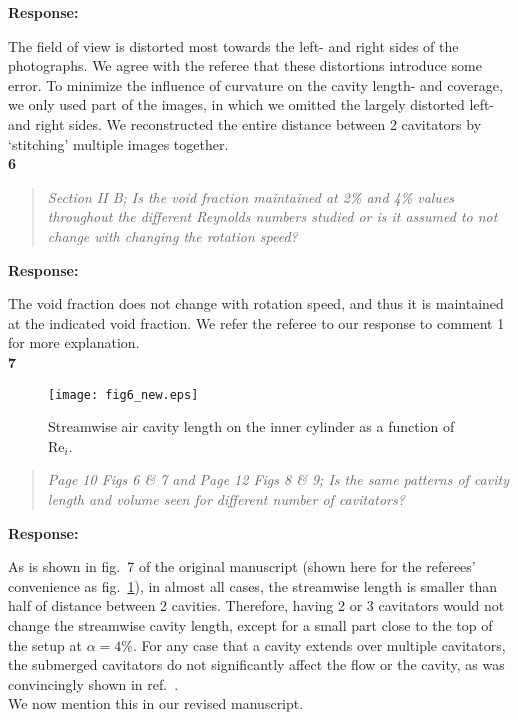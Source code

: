 \documentclass[10pt]{article}
\renewcommand{\Re}{\mathrm{Re}}
\newcommand{\strong}[1]{\textbf{#1}}
\newcommand{\question}[1]{\begin{quote} \emph{#1}  \end{quote} }
\begin{document}
\noindent \strong{Response:} 

\noindent  The field of view is distorted most towards the left- and right sides of the photographs. We agree with the referee that these distortions introduce some error. To minimize the influence of curvature on the cavity length- and coverage, we only used part of the images, in which we omitted the largely distorted left- and right sides. We reconstructed the entire distance between 2 cavitators by `stitching' multiple images together. \\ 

\noindent \strong{6}

\question{Section II B; Is the void fraction maintained at 2\% and 4\% values throughout the different Reynolds numbers studied or is it assumed to not change with changing the rotation speed? }

\noindent \strong{Response:} 

\noindent The void fraction does not change with rotation speed, and thus it is maintained at the indicated void fraction. We refer the referee to our response to comment 1 for more explanation. \\

\noindent \strong{7}


\begin{figure}[htp]
\begin{center}
\texttt{[image: fig6\_new.eps]}
\caption{Streamwise air cavity length on the inner cylinder as a function of $\Re_i$. }
\label{fig:length}
\end{center}
\end{figure} 

\question{Page 10 Figs 6 \& 7 and Page 12 Figs 8 \& 9; Is the same patterns of cavity length and volume seen for different number of cavitators? }

\noindent \strong{Response:} 

\noindent As is shown in fig.\ 7 of the original manuscript (shown here for the referees' convenience as fig.\ \ref{fig:length}), in almost all cases, the streamwise length is smaller than half of distance between 2 cavities. Therefore, having 2 or 3 cavitators would not change the streamwise cavity length, except for a small part close to the top of the setup at $\alpha=4\%$.  For any case that a cavity extends over multiple cavitators, the submerged cavitators do not significantly affect  the flow or the cavity, as was convincingly shown in ref.\ \cite{Zverkhovskyi2014}.\\
We now mention this in our revised manuscript.\\
\end{document}
